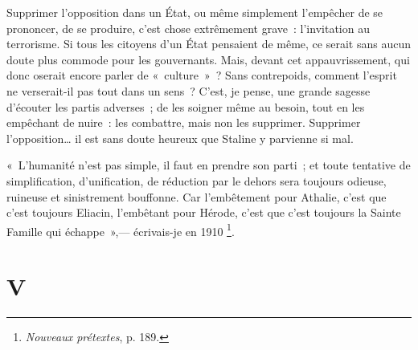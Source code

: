 \documentclass[twoside]{book} %
\newcommand{\astermono}{\medskip\centerline{\color{rubric}\large\selectfont{\syms ✻}}\medskip\par}%
\newcommand\chapteropen{} %
\newcommand\chapterclose{} %
\begin{document}
\astermono

\noindent Supprimer l’opposition dans un État, ou même simplement l’empêcher de se prononcer, de se produire, c’est chose extrêmement grave : l’invitation au terrorisme. Si tous les citoyens d’un État pensaient de même, ce serait sans aucun doute plus commode pour les gouvernants. Mais, devant cet appauvrissement, qui donc oserait encore parler de « culture » ? Sans contrepoids, comment l’esprit ne verserait-il pas tout dans un sens ? C’est, je pense, une grande sagesse d’écouter les partis adverses ; de les soigner même au besoin, tout en les empêchant de nuire : les combattre, mais non les supprimer. Supprimer l’opposition… il est sans doute heureux que Staline y parvienne si mal.\par
« L’humanité n’est pas simple, il faut en prendre son parti ; et toute tentative de simplification, d’unification, de réduction par le dehors sera toujours odieuse, ruineuse et sinistrement bouffonne. Car l’embêtement pour Athalie, c’est que c’est toujours Eliacin, l’embêtant pour Hérode, c’est que c’est toujours la Sainte Famille qui échappe »,— écrivais-je en 1910 \footnote{\emph{Nouveaux prétextes}, p. 189.}.
\chapterclose


\chapteropen

\chapter[{V}]{V}
\renewcommand{\leftmark}{V}
\end{document}

